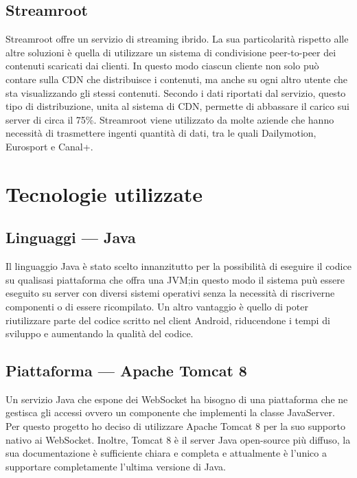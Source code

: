 	\subsection{Streamroot}
	Streamroot offre un servizio di streaming ibrido. La sua particolarità rispetto alle altre soluzioni è quella di utilizzare un sistema di condivisione peer-to-peer dei contenuti scaricati dai clienti. In questo modo ciascun cliente non solo può contare sulla CDN che distribuisce i contenuti, ma anche su ogni altro utente che sta visualizzando gli stessi contenuti. Secondo i dati riportati dal servizio, questo tipo di distribuzione, unita al sistema di CDN, permette di abbassare il carico sui server di circa il 75\%. Streamroot viene utilizzato da molte aziende che hanno necessità di trasmettere ingenti quantità di dati, tra le quali Dailymotion, Eurosport e Canal+.

\section{Tecnologie utilizzate}
	\subsection{Linguaggi --- Java}
	Il linguaggio Java è stato scelto innanzitutto per la possibilità di eseguire il codice su qualisasi piattaforma che offra una JVM;\@ in questo modo il sistema puù essere eseguito su server con diversi sistemi operativi senza la necessità di riscriverne componenti o di essere ricompilato. Un altro vantaggio è quello di poter riutilizzare parte del codice scritto nel client Android, riducendone i tempi di sviluppo e aumentando la qualità del codice.

	\subsection{Piattaforma --- Apache Tomcat 8}
	Un servizio Java che espone dei WebSocket ha bisogno di una piattaforma che ne gestisca gli accessi ovvero un componente che implementi la classe JavaServer. Per questo progetto ho deciso di utilizzare Apache Tomcat 8 per la suo supporto nativo ai WebSocket. Inoltre, Tomcat 8 è il server Java open-source più diffuso, la sua documentazione è sufficiente chiara e completa e attualmente è l'unico a supportare completamente l'ultima versione di Java.

